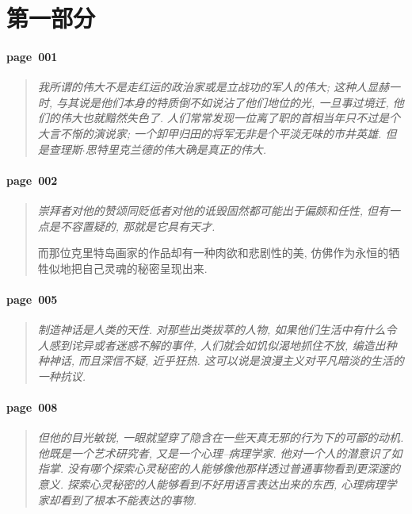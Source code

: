 \section{第一部分}

\paragraph*{page~001}
\begin{quotation}
    \itshape
    我所谓的伟大不是走红运的政治家或是立战功的军人的伟大; 这种人显赫一时, 与其说是他们本身的特质倒不如说沾了他们地位的光, 一旦事过境迁, 他们的伟大也就黯然失色了. 人们常常发现一位离了职的首相当年只不过是个大言不惭的演说家; 一个卸甲归田的将军无非是个平淡无味的市井英雄. 但是查理斯$\cdot$思特里克兰德的伟大确是真正的伟大. 
\end{quotation}

\paragraph*{page~002}
\begin{quotation}
    \itshape
    崇拜者对他的赞颂同贬低者对他的诋毁固然都可能出于偏颇和任性, 但有一点是不容置疑的, 那就是它具有天才.

    而那位克里特岛画家的作品却有一种肉欲和悲剧性的美, 仿佛作为永恒的牺牲似地把自己灵魂的秘密呈现出来.
\end{quotation}

\paragraph*{page~005}
\begin{quotation}
    \itshape
    制造神话是人类的天性. 对那些出类拔萃的人物, 如果他们生活中有什么令人感到诧异或者迷惑不解的事件, 人们就会如饥似渴地抓住不放, 编造出种种神话, 而且深信不疑, 近乎狂热. 这可以说是浪漫主义对平凡暗淡的生活的一种抗议. 
\end{quotation}

\paragraph*{page~008}
\begin{quotation}
    \itshape
    但他的目光敏锐, 一眼就望穿了隐含在一些天真无邪的行为下的可鄙的动机. 他既是一个艺术研究者, 又是一个心理--病理学家. 他对一个人的潜意识了如指掌. 没有哪个探索心灵秘密的人能够像他那样透过普通事物看到更深邃的意义. 探索心灵秘密的人能够看到不好用语言表达出来的东西, 心理病理学家却看到了根本不能表达的事物.
\end{quotation}

